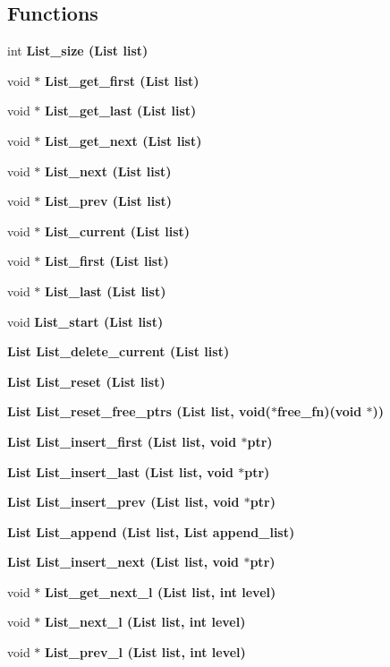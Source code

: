 \subsection*{Functions}
\begin{CompactItemize}
\item 
int \bf{List\_\-size} (\bf{List} \bf{list})
\item 
void $\ast$ \bf{List\_\-get\_\-first} (\bf{List} \bf{list})
\item 
void $\ast$ \bf{List\_\-get\_\-last} (\bf{List} \bf{list})
\item 
void $\ast$ \bf{List\_\-get\_\-next} (\bf{List} \bf{list})
\item 
void $\ast$ \bf{List\_\-next} (\bf{List} \bf{list})
\item 
void $\ast$ \bf{List\_\-prev} (\bf{List} \bf{list})
\item 
void $\ast$ \bf{List\_\-current} (\bf{List} \bf{list})
\item 
void $\ast$ \bf{List\_\-first} (\bf{List} \bf{list})
\item 
void $\ast$ \bf{List\_\-last} (\bf{List} \bf{list})
\item 
void \bf{List\_\-start} (\bf{List} \bf{list})
\item 
\bf{List} \bf{List\_\-delete\_\-current} (\bf{List} \bf{list})
\item 
\bf{List} \bf{List\_\-reset} (\bf{List} \bf{list})
\item 
\bf{List} \bf{List\_\-reset\_\-free\_\-ptrs} (\bf{List} \bf{list}, void($\ast$free\_\-fn)(void $\ast$))
\item 
\bf{List} \bf{List\_\-insert\_\-first} (\bf{List} \bf{list}, void $\ast$ptr)
\item 
\bf{List} \bf{List\_\-insert\_\-last} (\bf{List} \bf{list}, void $\ast$ptr)
\item 
\bf{List} \bf{List\_\-insert\_\-prev} (\bf{List} \bf{list}, void $\ast$ptr)
\item 
\bf{List} \bf{List\_\-append} (\bf{List} \bf{list}, \bf{List} append\_\-list)
\item 
\bf{List} \bf{List\_\-insert\_\-next} (\bf{List} \bf{list}, void $\ast$ptr)
\item 
void $\ast$ \bf{List\_\-get\_\-next\_\-l} (\bf{List} \bf{list}, int level)
\item 
void $\ast$ \bf{List\_\-next\_\-l} (\bf{List} \bf{list}, int level)
\item 
void $\ast$ \bf{List\_\-prev\_\-l} (\bf{List} \bf{list}, int level)
\item 

\end{CompactItemize}

